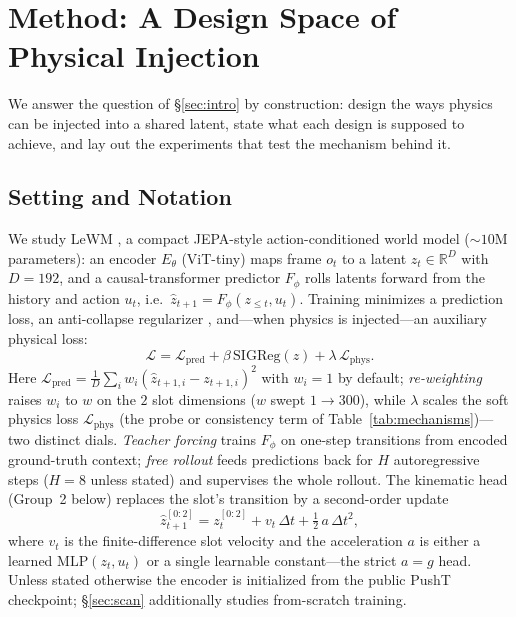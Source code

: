 \section{Method: A Design Space of Physical Injection}
\label{sec:method}

We answer the question of \S\ref{sec:intro} by construction: design the ways physics can be injected into a shared latent, state what each design is supposed to achieve, and lay out the experiments that test the mechanism behind it.

\subsection{Setting and Notation}
\label{sec:prelim}

We study LeWM \citep{maes2025lewm}, a compact JEPA-style action-conditioned world model (${\sim}10$M parameters): an encoder $E_\theta$ (ViT-tiny) maps frame $o_t$ to a latent $z_t\in\mathbb{R}^{D}$ with $D{=}192$, and a causal-transformer predictor $F_\phi$ rolls latents forward from the history and action $u_t$, i.e.\ $\hat z_{t+1}=F_\phi(z_{\le t},u_t)$. Training minimizes a prediction loss, an anti-collapse regularizer \citep{balestriero2025lejepa}, and---when physics is injected---an auxiliary physical loss:
\begin{equation}
\mathcal{L}=\mathcal{L}_{\mathrm{pred}}+\beta\,\mathrm{SIGReg}(z)+\lambda\,\mathcal{L}_{\mathrm{phys}}.
\label{eq:loss}
\end{equation}
Here $\mathcal{L}_{\mathrm{pred}}=\frac{1}{D}\sum_i w_i(\hat z_{t+1,i}-z_{t+1,i})^2$ with $w_i{=}1$ by default; \emph{re-weighting} raises $w_i$ to $w$ on the $2$ slot dimensions ($w$ swept $1\!\to\!300$), while $\lambda$ scales the soft physics loss $\mathcal{L}_{\mathrm{phys}}$ (the probe or consistency term of Table~\ref{tab:mechanisms})---two distinct dials. \emph{Teacher forcing} trains $F_\phi$ on one-step transitions from encoded ground-truth context; \emph{free rollout} feeds predictions back for $H$ autoregressive steps ($H{=}8$ unless stated) and supervises the whole rollout. The kinematic head (Group~2 below) replaces the slot's transition by a second-order update
\begin{equation}
\hat z^{[0:2]}_{t+1}=z^{[0:2]}_{t}+v_t\,\Delta t+\tfrac{1}{2}\,a\,\Delta t^{2},
\label{eq:kin}
\end{equation}
where $v_t$ is the finite-difference slot velocity and the acceleration $a$ is either a learned $\mathrm{MLP}(z_t,u_t)$ or a single learnable constant---the strict $a{=}g$ head. Unless stated otherwise the encoder is initialized from the public PushT checkpoint; \S\ref{sec:scan} additionally studies from-scratch training.

